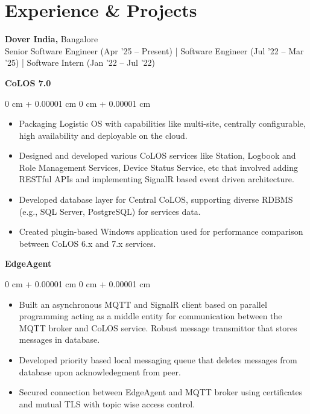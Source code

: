 \documentclass[10pt, letterpaper]{article}
\newenvironment{highlightsForExp}{
    \begin{itemize}[
        topsep=0.05 cm,
        parsep=0.05 cm,
        partopsep=0pt,
        itemsep=0pt,
        leftmargin=0 cm + 14pt
    ]
}{
    \end{itemize}
} %
\newenvironment{onecolentry}{
    \begin{adjustwidth}{
        0 cm + 0.00001 cm
    }{
        0 cm + 0.00001 cm
    }
}{
    \end{adjustwidth}
} %
\begin{document}
 
    \section{Experience \& Projects}
        \textbf{\large{Dover India,}} {\large{Bangalore}} \\
        Senior Software Engineer (Apr '25 -- Present) | Software Engineer (Jul '22 -- Mar '25) | Software Intern (Jan '22 -- Jul '22)
        
             \vspace{0.10 cm}
             \hspace{2pt}\textbf{CoLOS 7.0}
            \begin{onecolentry}
            \begin{highlightsForExp}
                \item Packaging Logistic OS with capabilities like multi-site, centrally configurable, high availability and deployable on the cloud.
                \item Designed and developed various CoLOS services like Station, Logbook and Role Management Services, Device Status Service, etc that involved adding RESTful APIs and implementing SignalR based event driven architecture.
                \item Developed database layer for Central CoLOS, supporting diverse RDBMS (e.g., SQL Server, PostgreSQL) for services data.
                \item Created plugin-based Windows application used for performance comparison between CoLOS 6.x and 7.x services.
            \end{highlightsForExp}
        \end{onecolentry}
        

        \vspace{0.10 cm}
        \hspace{2pt}\textbf{EdgeAgent}
        \vspace{0.10 cm}
        \begin{onecolentry}
            \begin{highlightsForExp}
                \item Built an asynchronous MQTT and SignalR client based on parallel programming acting as a middle entity for communication between the MQTT broker and CoLOS service. Robust message transmittor that stores messages in database.
                \item Developed priority based local messaging queue that deletes messages from database upon acknowledegment from peer.
                \item Secured connection between EdgeAgent and MQTT broker using certificates and mutual TLS with topic wise access control.
            \end{highlightsForExp}
        \end{onecolentry}
\end{document}
